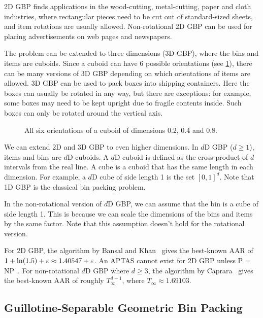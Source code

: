 2D GBP finds applications in the wood-cutting, metal-cutting, paper and cloth industries,
where rectangular pieces need to be cut out of standard-sized sheets,
and item rotations are usually allowed.
Non-rotational 2D GBP can be used for placing advertisements on web pages and newspapers.

The problem can be extended to three dimensions (3D GBP),
where the bins and items are cuboids.
Since a cuboid can have 6 possible orientations (see \cref{fig:3d-orients}), there can be
many versions of 3D GBP depending on which orientations of items are allowed.
3D GBP can be used to pack boxes into shipping containers.
Here the boxes can usually be rotated in any way, but there are exceptions:
for example, some boxes may need to be kept upright due to fragile contents inside.
Such boxes can only be rotated around the vertical axis.

\begin{figure}[htb]
\centering

\caption{All six orientations of a cuboid of dimensions 0.2, 0.4 and 0.8.}
\label{fig:3d-orients}
\end{figure}

We can extend 2D and 3D GBP to even higher dimensions.
In $d$D GBP ($d \ge 1$), items and bins are $d$D cuboids.
A $d$D cuboid is defined as the cross-product of $d$ intervals from the real line.
A cube is a cuboid that has the same length in each dimension.
For example, a $d$D cube of side length 1 is the set $[0, 1]^d$.
Note that 1D GBP is the classical bin packing problem.

In the non-rotational version of $d$D GBP, we can assume \wLoG{} that
the bin is a cube of side length 1.
This is because we can scale the dimensions of the bins and items by the same factor.
Note that this assumption doesn't hold for the rotational version.

For 2D GBP, the algorithm by Bansal and Khan~\cite{bansal2014binpacking}
gives the best-known AAR of $1 + \ln(1.5) + \varepsilon \approx 1.40547 + \varepsilon$.
An APTAS cannot exist for 2D GBP unless P = NP~\cite{bansal2006bin,chlebik2009hardness}.
For non-rotational $d$D GBP where $d \ge 3$, the algorithm by Caprara~\cite{caprara2008}
gives the best-known AAR of roughly $T_{\infty}^{d-1}$, where $T_{\infty} \approx 1.69103$.

\subsection{Guillotine-Separable Geometric Bin Packing}

